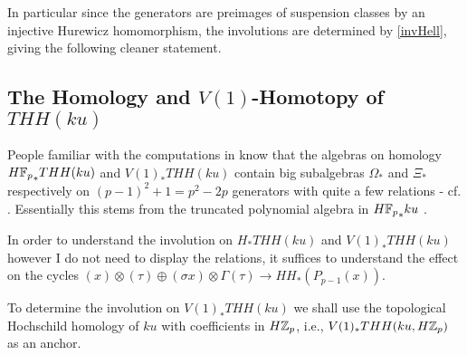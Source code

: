 In particular since the generators are preimages of suspension classes by an
injective Hurewicz homomorphism, the involutions are determined by \ref{invHell},
giving the following cleaner statement.
{}

\subsection{The Homology and $V(1)$-Homotopy of $THH(ku)$}
People familiar with the computations in \cite{AuTHH} know that the
algebras on homology ${H\mathbb{F}_p}_*THH(ku)$ and $V(1)_*THH(ku)$ contain  
big subalgebras $\Omega_*$ and $\Xi_*$ respectively 
on $(p-1)^2+1=p^2-2p$ generators with quite a few relations 
- cf. \cite[Definition 9.9, Definition 9.13]{AuTHH}. Essentially this stems from the 
truncated polynomial algebra in ${H\mathbb{F}_p}_*ku$ \cite[Proposition 2.3]{AuTHH}.

In order to understand the involution on $H_*THH(ku)$ and $V(1)_*THH(ku)$
however I do not need to display the relations, it suffices to understand
the effect on the cycles 
$(x)\otimes (\tau)\oplus (\sigma x)\otimes \Gamma(\tau)
\rightarrow HH_*(P_{p-1}(x))$.

To determine the involution on $V(1)_*THH(ku)$ we shall use the topological
Hochschild homology of $ku$ with coefficients in $H\mathbb{Z}_p$, i.e., 
$V(1)_*THH(ku,H\mathbb{Z}_p)$ as an anchor.
{}

